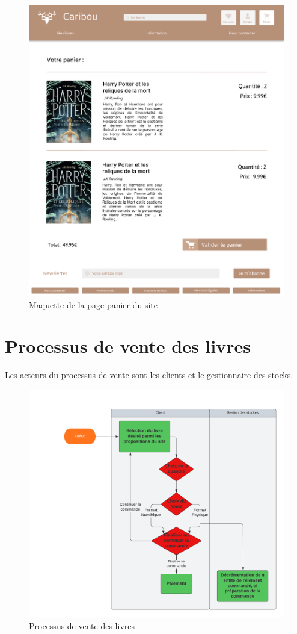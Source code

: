 \documentclass[14pt]{extarticle}
\begin{document}
\begin{figure}[H]
    \centering
    \includegraphics[width=0.8\linewidth]{images/m_panier.png}
    \caption{Maquette de la page panier du site}
\end{figure}

\newpage
\section{Processus de vente des livres}
Les acteurs du processus de vente sont les clients et le gestionnaire des stocks.
\begin{figure}[H]
    \centering
    \includegraphics[width=0.8\linewidth]{images/orga.png}
    \caption{Processus de vente des livres}
\end{figure}
\end{document}
